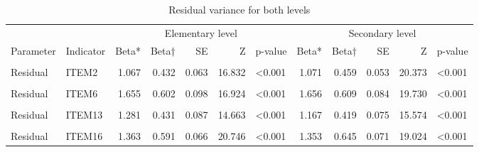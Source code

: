 \documentclass[
]{article}
\begin{document}
\begin{table}

\caption{\label{tab:unnamed-chunk-26}Residual variance for both levels}
\centering
\begin{tabular}[t]{llrrrrlrrrrl}
\toprule
\multicolumn{2}{c}{ } & \multicolumn{5}{c}{Elementary level} & \multicolumn{5}{c}{Secondary level} \\
\cmidrule(l{3pt}r{3pt}){3-7} \cmidrule(l{3pt}r{3pt}){8-12}
Parameter & Indicator & Beta* & Beta† & SE & Z & p-value & Beta*  & Beta†  & SE  & Z  & p-value \\
\midrule
\cellcolor{gray!6}{Residual} & \cellcolor{gray!6}{ITEM1} & \cellcolor{gray!6}{1.095} & \cellcolor{gray!6}{0.398} & \cellcolor{gray!6}{0.062} & \cellcolor{gray!6}{17.641} & \cellcolor{gray!6}{<0.001} & \cellcolor{gray!6}{1.078} & \cellcolor{gray!6}{0.429} & \cellcolor{gray!6}{0.056} & \cellcolor{gray!6}{19.329} & \cellcolor{gray!6}{<0.001}\\
Residual & ITEM2 & 1.067 & 0.432 & 0.063 & 16.832 & <0.001 & 1.071 & 0.459 & 0.053 & 20.373 & <0.001\\
\cellcolor{gray!6}{Residual} & \cellcolor{gray!6}{ITEM3} & \cellcolor{gray!6}{1.322} & \cellcolor{gray!6}{0.452} & \cellcolor{gray!6}{0.089} & \cellcolor{gray!6}{14.773} & \cellcolor{gray!6}{<0.001} & \cellcolor{gray!6}{1.383} & \cellcolor{gray!6}{0.479} & \cellcolor{gray!6}{0.083} & \cellcolor{gray!6}{16.704} & \cellcolor{gray!6}{<0.001}\\
Residual & ITEM6 & 1.655 & 0.602 & 0.098 & 16.924 & <0.001 & 1.656 & 0.609 & 0.084 & 19.730 & <0.001\\
\cellcolor{gray!6}{Residual} & \cellcolor{gray!6}{ITEM8} & \cellcolor{gray!6}{0.886} & \cellcolor{gray!6}{0.269} & \cellcolor{gray!6}{0.068} & \cellcolor{gray!6}{13.044} & \cellcolor{gray!6}{<0.001} & \cellcolor{gray!6}{0.890} & \cellcolor{gray!6}{0.306} & \cellcolor{gray!6}{0.061} & \cellcolor{gray!6}{14.560} & \cellcolor{gray!6}{<0.001}\\
Residual & ITEM13 & 1.281 & 0.431 & 0.087 & 14.663 & <0.001 & 1.167 & 0.419 & 0.075 & 15.574 & <0.001\\
\cellcolor{gray!6}{Residual} & \cellcolor{gray!6}{ITEM14} & \cellcolor{gray!6}{1.897} & \cellcolor{gray!6}{0.571} & \cellcolor{gray!6}{0.113} & \cellcolor{gray!6}{16.728} & \cellcolor{gray!6}{<0.001} & \cellcolor{gray!6}{1.883} & \cellcolor{gray!6}{0.599} & \cellcolor{gray!6}{0.110} & \cellcolor{gray!6}{17.084} & \cellcolor{gray!6}{<0.001}\\
Residual & ITEM16 & 1.363 & 0.591 & 0.066 & 20.746 & <0.001 & 1.353 & 0.645 & 0.071 & 19.024 & <0.001\\

\end{tabular}
\end{table}
\end{document}
